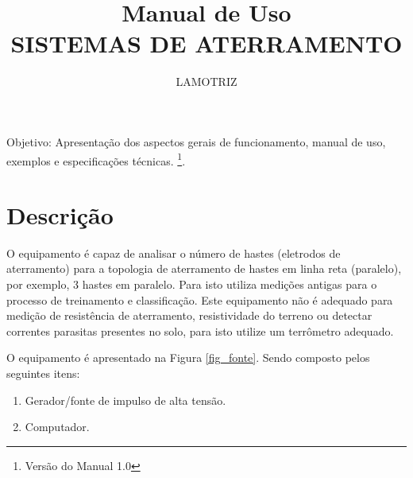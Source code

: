 \documentclass[a4paper, 10pt]{article}
\title{Manual de Uso\\SISTEMAS DE ATERRAMENTO}
\author{LAMOTRIZ}
\begin{document}
\maketitle

Objetivo: Apresentação dos aspectos gerais de funcionamento, manual de uso, 
exemplos e  especificações técnicas.
\footnote{Versão do Manual 1.0}.


\newpage

\tableofcontents

\newpage

\listoffigures

\newpage

\section{Descrição}

O equipamento é capaz de analisar o número de hastes
(eletrodos de aterramento) para a topologia de aterramento
de hastes em linha reta (paralelo), por exemplo, 3 hastes em paralelo. 
Para isto utiliza medições antigas para o processo de treinamento e 
classificação. Este equipamento não é adequado para medição de 
resistência de aterramento, resistividade do terreno ou detectar correntes 
parasitas presentes no solo, para isto utilize um terrômetro adequado. 

O equipamento é apresentado na Figura \ref{fig_fonte}. Sendo composto pelos 
seguintes itens:


\begin{enumerate}
    \item Gerador/fonte de impulso de alta tensão.
    \item Computador.
\end{enumerate}
\end{document}
